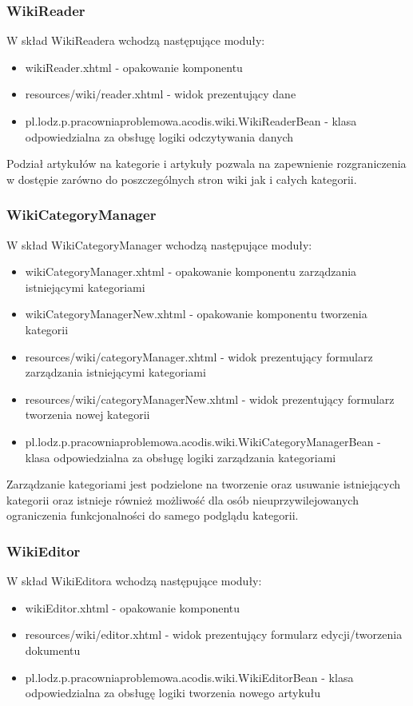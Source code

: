 \documentclass{classrep}
\begin{document}
\subsubsection{WikiReader}
W skład WikiReadera wchodzą następujące moduły:
\begin{itemize}
\item wikiReader.xhtml - opakowanie komponentu
\item resources/wiki/reader.xhtml - widok prezentujący dane
\item pl.lodz.p.pracowniaproblemowa.acodis.wiki.WikiReaderBean - klasa odpowiedzialna za obsługę logiki odczytywania danych
\end{itemize}

Podział artykułów na kategorie i artykuły pozwala na zapewnienie rozgraniczenia w dostępie zarówno do poszczególnych stron wiki jak i całych kategorii.

\subsubsection{WikiCategoryManager}
W skład WikiCategoryManager wchodzą następujące moduły:
\begin{itemize}
\item wikiCategoryManager.xhtml - opakowanie komponentu zarządzania istniejącymi kategoriami
\item wikiCategoryManagerNew.xhtml - opakowanie komponentu tworzenia kategorii
\item resources/wiki/categoryManager.xhtml - widok prezentujący formularz zarządzania istniejącymi kategoriami
\item resources/wiki/categoryManagerNew.xhtml - widok prezentujący formularz tworzenia nowej kategorii
\item pl.lodz.p.pracowniaproblemowa.acodis.wiki.WikiCategoryManagerBean - klasa odpowiedzialna za obsługę logiki zarządzania kategoriami
\end{itemize}

Zarządzanie kategoriami jest podzielone na tworzenie oraz usuwanie istniejących kategorii oraz istnieje również możliwość dla osób nieuprzywilejowanych ograniczenia funkcjonalności do samego podglądu kategorii.

\subsubsection{WikiEditor}
W skład WikiEditora wchodzą następujące moduły:
\begin{itemize}
\item wikiEditor.xhtml - opakowanie komponentu
\item resources/wiki/editor.xhtml - widok prezentujący formularz edycji/tworzenia dokumentu
\item pl.lodz.p.pracowniaproblemowa.acodis.wiki.WikiEditorBean - klasa odpowiedzialna za obsługę logiki tworzenia nowego artykułu
\end{itemize}
\end{document}
